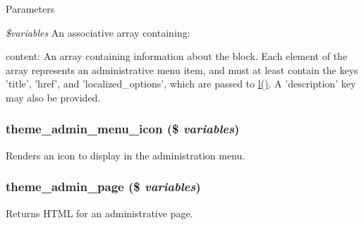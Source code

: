 \begin{DoxyParams}{Parameters}
\item[{\em \$variables}]An associative array containing:
\begin{DoxyItemize}
\item content: An array containing information about the block. Each element of the array represents an administrative menu item, and must at least contain the keys 'title', 'href', and 'localized\_\-options', which are passed to \hyperlink{common_8inc_ad3b36c06dc46250b8d22b8d0d2e7bd97}{l()}. A 'description' key may also be provided. 
\end{DoxyItemize}\end{DoxyParams}
\hypertarget{group__themeable_gab93751624cbfa203208fba5c90192ee1}{
\subsubsection[{theme\_\-admin\_\-menu\_\-icon}]{\setlength{\rightskip}{0pt plus 5cm}theme\_\-admin\_\-menu\_\-icon (\$ {\em variables})}}
\label{group__themeable_gab93751624cbfa203208fba5c90192ee1}
Renders an icon to display in the administration menu. \hypertarget{group__themeable_gaea8c6bf86d9f3e2cb91cca0edfa80d2c}{
\subsubsection[{theme\_\-admin\_\-page}]{\setlength{\rightskip}{0pt plus 5cm}theme\_\-admin\_\-page (\$ {\em variables})}}
\label{group__themeable_gaea8c6bf86d9f3e2cb91cca0edfa80d2c}
Returns HTML for an administrative page.


